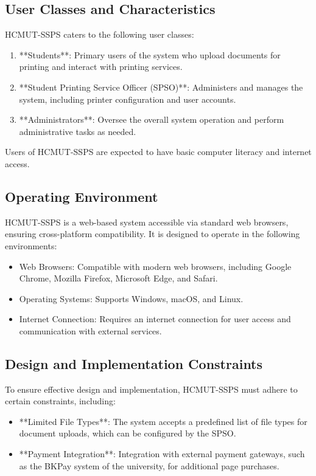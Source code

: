 \documentclass{article}
\begin{document}
\subsection{User Classes and Characteristics}
HCMUT-SSPS caters to the following user classes:
\begin{enumerate}
    \item **Students**: Primary users of the system who upload documents for printing and interact with printing services.
    \item **Student Printing Service Officer (SPSO)**: Administers and manages the system, including printer configuration and user accounts.
    \item **Administrators**: Oversee the overall system operation and perform administrative tasks as needed.
\end{enumerate}

Users of HCMUT-SSPS are expected to have basic computer literacy and internet access.

\subsection{Operating Environment}
HCMUT-SSPS is a web-based system accessible via standard web browsers, ensuring cross-platform compatibility. It is designed to operate in the following environments:
\begin{itemize}
    \item Web Browsers: Compatible with modern web browsers, including Google Chrome, Mozilla Firefox, Microsoft Edge, and Safari.
    \item Operating Systems: Supports Windows, macOS, and Linux.
    \item Internet Connection: Requires an internet connection for user access and communication with external services.
\end{itemize}

\subsection{Design and Implementation Constraints}
To ensure effective design and implementation, HCMUT-SSPS must adhere to certain constraints, including:
\begin{itemize}
    \item **Limited File Types**: The system accepts a predefined list of file types for document uploads, which can be configured by the SPSO.
    \item **Payment Integration**: Integration with external payment gateways, such as the BKPay system of the university, for additional page purchases.
\end{itemize}
\end{document}
